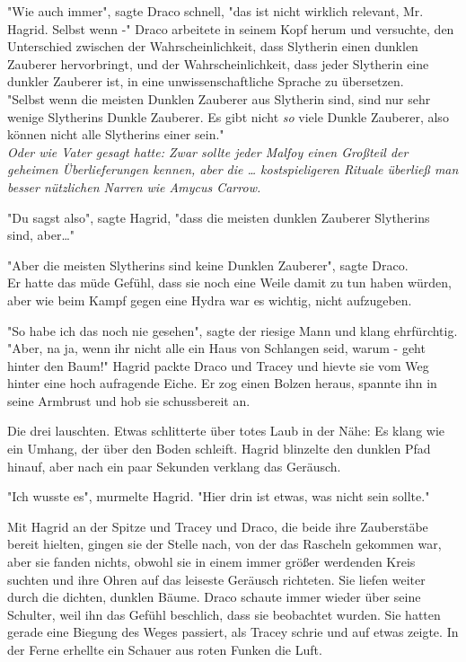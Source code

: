 {"Wie auch immer", sagte Draco schnell, "das ist nicht wirklich relevant, Mr. Hagrid. Selbst wenn -" Draco arbeitete in seinem Kopf herum und versuchte, den Unterschied zwischen der Wahrscheinlichkeit, dass Slytherin einen dunklen Zauberer hervorbringt, und der Wahrscheinlichkeit, dass jeder Slytherin eine dunkler Zauberer ist, in eine unwissenschaftliche Sprache zu übersetzen.\\ "Selbst wenn die meisten Dunklen Zauberer aus Slytherin sind, sind nur sehr wenige Slytherins Dunkle Zauberer. Es gibt nicht \emph{so} viele Dunkle Zauberer, also können nicht alle Slytherins einer sein."\\ \emph{Oder wie Vater gesagt hatte: Zwar sollte jeder Malfoy einen Großteil der geheimen Überlieferungen kennen, aber die … kostspieligeren Rituale überließ man besser nützlichen Narren wie Amycus Carrow.}

"Du sagst also", sagte Hagrid, "dass die meisten dunklen Zauberer Slytherins sind, aber…"

"Aber die meisten Slytherins sind keine Dunklen Zauberer", sagte Draco.\\ Er hatte das müde Gefühl, dass sie noch eine Weile damit zu tun haben würden, aber wie beim Kampf gegen eine Hydra war es wichtig, nicht aufzugeben.

"So habe ich das noch nie gesehen", sagte der riesige Mann und klang ehrfürchtig. "Aber, na ja, wenn ihr nicht alle ein Haus von Schlangen seid, warum - geht hinter den Baum!" Hagrid packte Draco und Tracey und hievte sie vom Weg hinter eine hoch aufragende Eiche. Er zog einen Bolzen heraus, spannte ihn in seine Armbrust und hob sie schussbereit an.

Die drei lauschten. Etwas schlitterte über totes Laub in der Nähe: Es klang wie ein Umhang, der über den Boden schleift. Hagrid blinzelte den dunklen Pfad hinauf, aber nach ein paar Sekunden verklang das Geräusch.

"Ich wusste es", murmelte Hagrid. "Hier drin ist etwas, was nicht sein sollte."

Mit Hagrid an der Spitze und Tracey und Draco, die beide ihre Zauberstäbe bereit hielten, gingen sie der Stelle nach, von der das Rascheln gekommen war, aber sie fanden nichts, obwohl sie in einem immer größer werdenden Kreis suchten und ihre Ohren auf das leiseste Geräusch richteten. Sie liefen weiter durch die dichten, dunklen Bäume. Draco schaute immer wieder über seine Schulter, weil ihn das Gefühl beschlich, dass sie beobachtet wurden. Sie hatten gerade eine Biegung des Weges passiert, als Tracey schrie und auf etwas zeigte. In der Ferne erhellte ein Schauer aus roten Funken die Luft.

}
